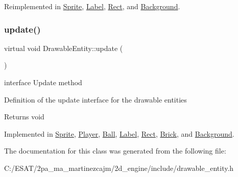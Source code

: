 Reimplemented in \hyperlink{class_sprite_a26066db75daec637f436d4635418059a}{Sprite}, \hyperlink{class_label_aa6a355fe8daa25c3739affcf66d66f7f}{Label}, \hyperlink{class_rect_a85afbe7fde3b74bd81c07cc58d5c61bd}{Rect}, and \hyperlink{class_background_ad3559e8684aca155ae68d53374f3540d}{Background}.

\mbox{\label{class_drawable_entity_acbf8317de062a2e0e79f646dbe75249c}} 
\subsubsection{\texorpdfstring{update()}{update()}}
{\footnotesize\ttfamily virtual void Drawable\+Entity\+::update (\begin{DoxyParamCaption}{ }\end{DoxyParamCaption})\hspace{0.3cm}{\ttfamily [pure virtual]}}



interface Update method 

Definition of the update interface for the drawable entities

\begin{DoxyReturn}{Returns}
void 
\end{DoxyReturn}


Implemented in \hyperlink{class_sprite_a1070fccd6830382b72e3f3a8785afc8c}{Sprite}, \hyperlink{class_player_abe7d0a24ffd93ba0bc4eea860b10eb09}{Player}, \hyperlink{class_ball_a26c877660343d086a9d45891659474f8}{Ball}, \hyperlink{class_label_adcd154f9e53d277c1b7a11bd058936a0}{Label}, \hyperlink{class_rect_af74b7ea3228d0d7b4c40bb8fe6daed63}{Rect}, \hyperlink{class_brick_a4debb742abe5d19442d910bb8ecf083e}{Brick}, and \hyperlink{class_background_af4a37c0ac474de5f65130cbef3d61379}{Background}.



The documentation for this class was generated from the following file\+:\begin{DoxyCompactItemize}
\item 
C\+:/\+E\+S\+A\+T/2pa\+\_\+ma\+\_\+martinezcajm/2d\+\_\+engine/include/drawable\+\_\+entity.\+h\end{DoxyCompactItemize}
